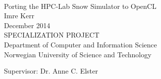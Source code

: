 
\thispagestyle{empty}
\mbox{}\\[6pc]
\begin{center}
\Huge{Porting the HPC-Lab Snow Simulator to OpenCL}\\[2pc]

\Large{Imre Kerr}\\[1pc]
\large{December 2014}\\[2pc]

SPECIALIZATION PROJECT\\
Department of Computer and Information Science\\
Norwegian University of Science and Technology
\end{center}
\vfill

\noindent Supervisor: Dr. Anne C. Elster


